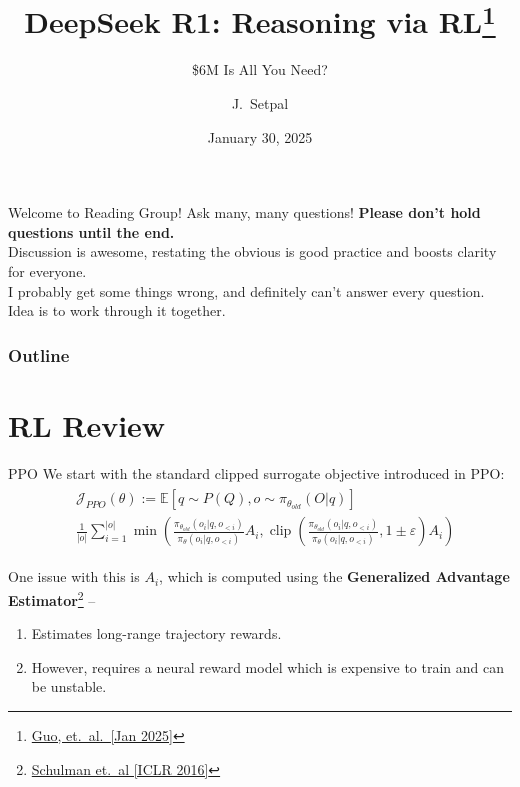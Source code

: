 \documentclass{beamer}
\title[DeepSeek R1]{DeepSeek R1: Reasoning via RL\thanks{\href{https://raw.githubusercontent.com/deepseek-ai/DeepSeek-R1/refs/heads/main/DeepSeek_R1.pdf}{Guo, et.~al.~[Jan 2025]}}}
\subtitle{\$6M Is All You Need?}
\author[Machine Learning @ Purdue] %
{J.~Setpal}
\date{January 30, 2025}
\DeclareMathOperator*{\clip}{clip}
\begin{document}
\frame{\titlepage}

\begin{frame}{Welcome to Reading Group!}
	Ask many, many questions! \textbf{Please don't hold questions until the end.} \pause \newline \\
	Discussion is awesome, restating the obvious is good practice and boosts clarity for everyone. \pause \newline \\
	I probably get some things wrong, and definitely can't answer every question. Idea is to work through it together.
\end{frame}


\begin{frame}
\frametitle{Outline}
\tableofcontents
\end{frame}

\section{RL Review}
{\let\oldfootnoterule\footnoterule
\def\footnoterule{\only<2->\oldfootnoterule}
\begin{frame}{PPO}
	We start with the standard clipped surrogate objective introduced in PPO:
	\begin{gather}
		\begin{split}
			&\mathcal{J}_{PPO}(\theta) := \mathbb{E}[q \sim P(Q), o \sim \pi_{\theta_{old}}(O | q)] \\
			&\frac{1}{|o|} \sum^{|o|}_{i=1} \min \left(\frac{\pi_{\theta_{old}}(o_i | q, o_{<i})}{\pi_\theta(o_i | q, o_{<i})} A_i, \clip \left( \frac{\pi_{\theta_{old}}(o_i | q, o_{<i})}{\pi_\theta(o_i | q, o_{<i})}, 1 \pm \varepsilon \right)  A_i \right)
		\end{split}
	\end{gather} \pause

	One issue with this is $A_i$, which is computed using the \textbf{Generalized Advantage Estimator}\footnote<2->{\href{https://arxiv.org/abs/1506.02438}{Schulman et.~al [ICLR 2016]}} --
	\begin{enumerate}[label=\arabic*.]
		\item Estimates long-range trajectory rewards. \pause \\
		\item However, requires a neural reward model which is expensive to train and can be unstable.
	\end{enumerate}
\end{frame}
}
\end{document}
